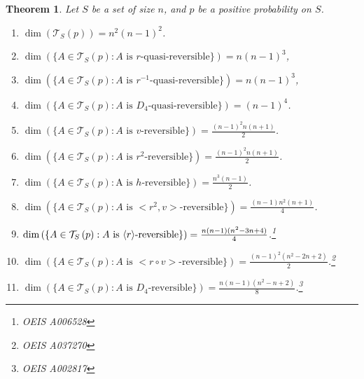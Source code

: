 \documentclass[10pt]{amsart}
\newtheorem{theo}{Theorem}[section]
\theoremstyle{definition}\newtheorem{defi}[theo]{Definition}\newtheorem{rema}[theo]{Remark}\newtheorem{exam}[theo]{Example}\newtheorem{exem}[theo]{Example}\newtheorem{nota}[theo]{Notation}
\DeclarePairedDelimiter{\vect}{\langle}{\rangle}
\newcounter{a}
\newcommand{\triang}[2]{\mathcal{T}_{#1} \left(#2 \right)}
\begin{document}
\begin{theo}\label{theo:dim}
Let $S$ be a set of size $n$, and $p$ be a positive probability on $S$.
\begin{enumerate}
\item \label{list9.6.1}$\dim \left(\triang{S}{p} \right) = n^2 (n-1)^2$.
\item \label{list9.6.2}$\dim \left(\{A \in \triang{S}{p} : \text{$A$ is $r$-quasi-reversible}\} \right) = n (n-1)^3$,
\item \label{list9.6.3}$\dim \left(\{A \in \triang{S}{p} : \text{$A$ is $r^{-1}$-quasi-reversible}\} \right) = n (n-1)^3$,
\item \label{list9.6.4}$\dim \left(\{A \in \triang{S}{p} : \text{$A$ is $D_4$-quasi-reversible}\} \right) = (n-1)^4$.
\item \label{list9.6.5}$ \dim \left(\{A \in \triang{S}{p} : \text{$A$ is $v$-reversible}\} \right) = \frac{(n-1)^2 n (n+1)}{2}$.
\item \label{list9.6.6}$ \dim \left(\{A \in \triang{S}{p} : \text{$A$ is $r^2$-reversible}\} \right) = \frac{(n-1)^2 n (n+1)}{2}$.
\item \label{list9.6.7}$ \dim \left(\{A \in \triang{S}{p} : \text{A is $h$-reversible}\} \right) = \frac{n^3 (n-1)}{2}$.
\item \label{list9.6.8}$ \dim \left(\{A \in \triang{S}{p} : \text{$A$ is $<r^2,v>$-reversible}\} \right) = \frac{(n-1) n^2 (n+1)}{4}$.
\item \label{list9.6.9}$ \dim \left(\{A \in \triang{S}{p} : \text{$A$ is $\vect{r}$-reversible}\} \right) = \frac{n(n-1) (n^2-3n+4)}{4}$.\footnote{OEIS A006528}
\item \label{list9.6.10}$ \dim \left(\{A \in \triang{S}{p} : \text{$A$ is $<r \circ v>$-reversible}\} \right) = \frac{(n-1)^2(n^2-2n+2)}{2}$.\footnote{OEIS A037270}
\item \label{list9.6.11}$ \dim \left(\{A \in \triang{S}{p} : \text{$A$ is $D_4$-reversible}\} \right) = \frac{n(n-1)(n^2-n+2)}{8}$.\footnote{OEIS A002817}
\end{enumerate}
\end{theo}
\end{document}
